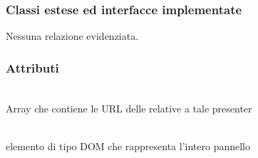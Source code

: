 \subsubsection*{Classi estese ed interfacce implementate}
Nessuna relazione evidenziata.

\subsubsection*{Attributi}
\begin{description}
\item{}\\
Array che contiene le URL delle  relative a tale presenter
\item{}\\
elemento di tipo DOM che rappresenta l'intero pannello
\end{description}

